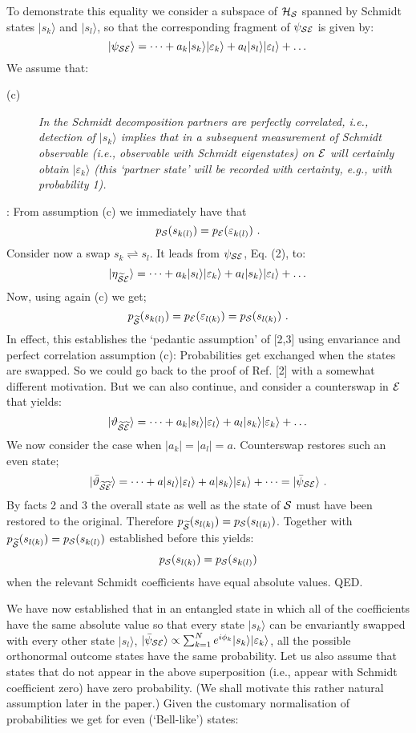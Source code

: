 \documentclass[aps,pra,epsfig,11pt,floatfix]{revtex4}
\begin{document}
To demonstrate this equality we consider a subspace of ${\cal H_S}$ spanned by
Schmidt states $|s_k\rangle$ and $|s_l\rangle$, so that the corresponding
fragment of $\psi_{\cal SE}$ is given by:
$$ |\psi_{\cal SE}\rangle = \dots + a_k|s_k\rangle|\varepsilon_k\rangle
+a_l|s_l\rangle|\varepsilon_l\rangle + \dots $$
We assume that:
\begin{description}
\item [(c)] {\it In the Schmidt decomposition partners are perfectly
correlated, i.e., detection of $|s_k\rangle$ implies that in a subsequent
measurement of Schmidt observable (i.e., observable with Schmidt eigenstates)
on ${\cal E}$ will certainly obtain $|\varepsilon_k\rangle$
(this `partner state' will be recorded with certainty, e.g., with probability 1).}
\end{description}
: From assumption (c) we immediately have that
$$p_{\cal S}(s_{k(l)})= p_{\cal E} (\varepsilon_{k(l)}) \ . $$
Consider now a swap $s_k \rightleftharpoons s_l$. It leads from
$\psi_{\cal SE}$, Eq. (2), to:
$$|\eta_{\widetilde{\cal S}{\cal E}}\rangle=\dots+a_k|s_l\rangle
|\varepsilon_k\rangle +a_l|s_k\rangle|\varepsilon_l\rangle + \dots $$
Now, using again (c) we get;
$$p_{\widetilde {\cal S}} (s_{k(l)})
= p_{\cal E} (\varepsilon_{l(k)}) = p_{\cal S}(s_{l(k)})\ . $$
In effect, this establishes the `pedantic assumption' of [2,3] using envariance
and perfect correlation assumption (c): Probabilities get exchanged when
the states are swapped. So we could go back to the proof of Ref. [2] with
a somewhat different motivation. But we can also continue, and consider
a counterswap in ${\cal E}$ that yields:
$$|\vartheta_{\widetilde{\cal S}\widetilde{\cal 
E}}\rangle=\dots+a_k|s_l\rangle|\varepsilon_l\rangle
+a_l|s_k\rangle|\varepsilon_k\rangle + \dots $$
We now consider the case when $|a_k|=|a_l|=a$. Counterswap restores such
an even state;
$$|\bar \vartheta_{\widetilde{\cal S}\widetilde{\cal E}}\rangle
=\dots+a|s_l\rangle|\varepsilon_l\rangle
+a|s_k\rangle|\varepsilon_k\rangle + \dots = |\bar\psi_{\cal SE}\rangle \ . $$
By facts 2 and 3 the overall state as well as the state of ${\cal S}$ must have
been restored to the original. Therefore $ p_{\widetilde{\cal S}}(s_{l(k)}) =
p_{\cal S}(s_{l(k)})$. Together with $p_{\widetilde{\cal S}}(s_{l(k)})=
p_{\cal S}(s_{k(l)})$ established before this yields:
$$ p_{\cal S}(s_{l(k)}) = p_{\cal S}(s_{k(l)})  $$
when the relevant Schmidt coefficients have equal absolute values.
QED.

We have now established that in an entangled state in which all of
the coefficients have the same absolute value so that every state $|s_k\rangle$
can be envariantly swapped with every other state $|s_l\rangle$,
$|\bar\psi_{\cal SE}\rangle \propto \sum_{k=1}^N e^{i \phi_k} |s_k\rangle
|\varepsilon_k\rangle $, all the possible orthonormal outcome states
have the same probability. Let us also assume that states that
do not appear in the above superposition (i.e., appear with Schmidt
coefficient zero) have zero probability. (We shall motivate this rather natural
assumption later in the paper.) Given the customary normalisation
of probabilities we get for even (`Bell-like') states:
\end{document}
